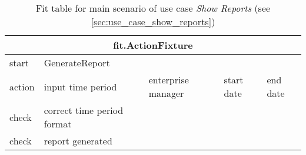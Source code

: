 \begin{table}[H]
\begin{centering}
\begin{tabular}{|l|l|l|l|l|}

\hline  \multicolumn{5}{|c|}{fit.ActionFixture} \\
\hline start & GenerateReport &  \multicolumn{3}{|c|}{ }  \\ 
\hline action & input time period & enterprise manager  & start date  & end date \\ 
\hline check & correct time period format  &  \multicolumn{3}{|c|}{ }\\ 
\hline check & report generated  &  \multicolumn{3}{|c|}{ }   \\ 
\hline 
\end{tabular}

\caption{Fit table for main scenario of use case \emph{Show Reports} (see \autoref{sec:use_case_show_reports})}
 
\par
\end{centering}
\end{table}



